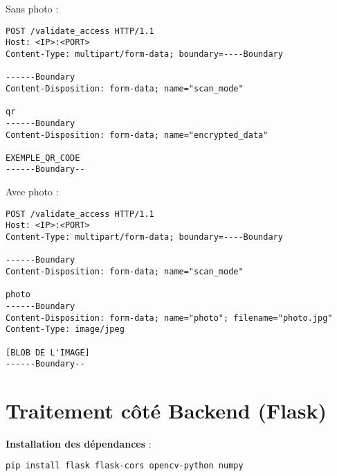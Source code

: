 \documentclass[a4paper,12pt]{article}
\begin{document}
Sans photo :
\begin{lstlisting}
POST /validate_access HTTP/1.1
Host: <IP>:<PORT>
Content-Type: multipart/form-data; boundary=----Boundary

------Boundary
Content-Disposition: form-data; name="scan_mode"

qr
------Boundary
Content-Disposition: form-data; name="encrypted_data"

EXEMPLE_QR_CODE
------Boundary--
\end{lstlisting}

Avec photo :
\begin{lstlisting}
POST /validate_access HTTP/1.1
Host: <IP>:<PORT>
Content-Type: multipart/form-data; boundary=----Boundary

------Boundary
Content-Disposition: form-data; name="scan_mode"

photo
------Boundary
Content-Disposition: form-data; name="photo"; filename="photo.jpg"
Content-Type: image/jpeg

[BLOB DE L'IMAGE]
------Boundary--
\end{lstlisting}

\section{Traitement côté Backend (Flask)}

\textbf{Installation des dépendances} :
\begin{lstlisting}[language=bash]
pip install flask flask-cors opencv-python numpy
\end{lstlisting}
\end{document}
